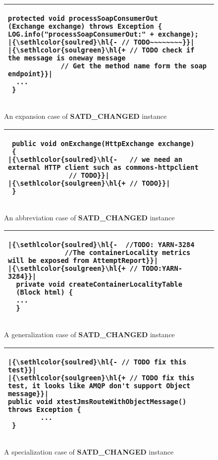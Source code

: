 \documentclass[3p]{elsarticle}
\DeclareRobustCommand{\hlremove}[1]{{\sethlcolor{soulred}\hl{#1}}}
\DeclareRobustCommand{\hladd}[1]{{\sethlcolor{soulgreen}\hl{#1}}}
\begin{document}
\begin{figure}[htbp]
    \centering
    \begin{tabular}{|p{28em}|}
    \hline
        \begin{lstlisting}
protected void processSoapConsumerOut
(Exchange exchange) throws Exception {
LOG.info("processSoapConsumerOut:" + exchange);
|\hlremove{- // TODO~~~~~~~~}|
|\hladd   {+ // TODO check if the message is oneway message
             // Get the method name form the soap endpoint}|
  ...
 }
        \end{lstlisting}
    \\\hline
    \end{tabular}
    \caption{An expansion case of \textbf{SATD\_CHANGED} instance}
    \label{fig:change_expansion}
    
\vspace{0.70cm}

    \centering
    \begin{tabular}{|p{28em}|}
    \hline
        \begin{lstlisting}
 public void onExchange(HttpExchange exchange)
 {
|\hlremove{-   // we need an external HTTP client such as commons-httpclient
               // TODO}|
|\hladd   {+ // TODO}|
 }
        \end{lstlisting}
    \\\hline
    \end{tabular}
    \caption{An abbreviation case of \textbf{SATD\_CHANGED} instance}
    \label{fig:change_abbreviation}

\vspace{0.70cm}
    \centering
    \begin{tabular}{|p{28em}|}
    \hline
        \begin{lstlisting}
|\hlremove{-  //TODO: YARN-3284
              //The containerLocality metrics will be exposed from AttemptReport}|
|\hladd   {+ // TODO:YARN-3284}|
  private void createContainerLocalityTable
  (Block html) {
  ...
  }
        \end{lstlisting}
    \\\hline
    \end{tabular}
    \caption{A generalization case of \textbf{SATD\_CHANGED} instance}
    \label{fig:change_generalization}    
    
\vspace{0.70cm}
    \centering
    \begin{tabular}{|p{28em}|}
    \hline
        \begin{lstlisting}
|\hlremove{- // TODO fix this test}|
|\hladd   {+ // TODO fix this test, it looks like AMQP don't support Object message}|
public void xtestJmsRouteWithObjectMessage() 
throws Exception {
        ...
 }
        \end{lstlisting}
    \\\hline
    \end{tabular}
    \caption{A specialization case of \textbf{SATD\_CHANGED} instance}
    \label{fig:change_specialization}  
\end{figure}
\end{document}
